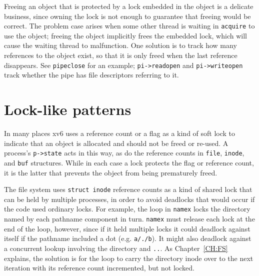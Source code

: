 Freeing an object that is protected by a lock embedded in the object
is a delicate business, since owning the lock is
not enough to guarantee that freeing would be correct. The problem
case arises when some other thread is waiting in {\tt acquire} to use
the object; freeing the object implicitly frees the embedded lock, which will
cause the waiting thread to malfunction. One solution is to track how
many references to the object exist, so that it is only freed when the
last reference disappears. See {\tt pipeclose}
 for an example;
{\tt pi->readopen} and {\tt pi->writeopen} track whether
the pipe has file descriptors referring to it.


\section{Lock-like patterns}

In many places xv6 uses a reference count or a flag as a kind of soft
lock to indicate that an object is allocated and should not be freed
or re-used. A process's {\tt p->state} acts in this way, as do the
reference counts in {\tt file}, {\tt inode}, and {\tt buf} structures.
While in each case a lock protects the flag or reference count, it is
the latter that prevents the object from being prematurely freed.

The file system uses {\tt struct inode} reference counts as a kind of
shared lock that can be held by multiple processes, in order to avoid
deadlocks that would occur if the code used ordinary locks. For
example, the loop in {\tt namex}  locks
the directory named by each pathname component in turn. {\tt namex}
must release each lock at the end of the loop, however, since if it
held multiple locks it could deadlock against itself if the pathname
included a dot (e.g. {\tt a/./b}). It might also deadlock against a
concurrent lookup involving the directory and {\tt ..}. As
Chapter~\ref{CH:FS} explains, the solution is for the loop to carry
the directory inode over to the next iteration with its reference
count incremented, but not locked.

